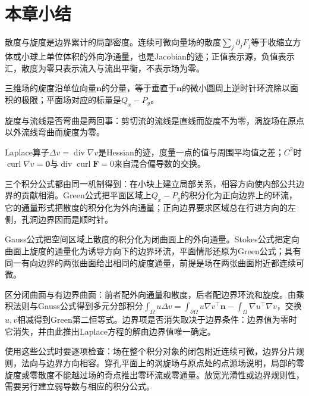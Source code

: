 \FloatBarrier
\section{本章小结}
\label{sec:integral-theorems-summary}

散度与旋度是边界累计的局部密度。连续可微向量场的散度$\sum_j\partial_jF_j$等于收缩立方体或小球上单位体积的外向净通量，也是Jacobian的迹；正值表示源，负值表示汇，散度为零只表示流入与流出平衡，不表示场为零。

三维场的旋度沿单位向量$\bm n$的分量，等于垂直于$\bm n$的微小圆周上逆时针环流除以面积的极限；平面场对应的标量是$Q_x-P_y$。

旋度与流线是否弯曲是两回事：剪切流的流线是直线而旋度不为零，涡旋场在原点以外流线弯曲而旋度为零。

Laplace算子$\Delta v=\operatorname{div}\nabla v$是Hessian的迹，度量一点的值与周围平均值之差；$C^2$时$\operatorname{curl}\nabla v=\bm0$与$\operatorname{div}\operatorname{curl}\bm F=0$来自混合偏导数的交换。

三个积分公式都由同一机制得到：在小块上建立局部关系，相容方向使内部公共边界的贡献相消。Green公式把平面区域上$Q_x-P_y$的积分化为正向边界上的环流，它的通量形式把散度的积分化为外向通量；正向边界要求区域总在行进方向的左侧，孔洞边界因而是顺时针。

Gauss公式把空间区域上散度的积分化为闭曲面上的外向通量。Stokes公式把定向曲面上旋度的通量化为诱导方向下的边界环流，平面情形还原为Green公式；具有同一有向边界的两张曲面给出相同的旋度通量，前提是场在两张曲面附近都连续可微。

区分闭曲面与有边界曲面：前者配外向通量和散度，后者配边界环流和旋度。由乘积法则与Gauss公式得到多元分部积分$\int_\Omega u\Delta v=\int_{\partial\Omega}u\nabla v^\top\bm n-\int_\Omega\nabla u^\top\nabla v$，交换$u,v$相减得到Green第二恒等式。边界项是否消失取决于边界条件：边界值为零时它消失，并由此推出Laplace方程的解由边界值唯一确定。

使用这些公式时要逐项检查：场在整个积分对象的闭包附近连续可微，边界分片规则，法向与边界方向相容。穿孔平面上的涡旋场与原点处的点源场说明，局部的零旋度或零散度不能越过场的奇点推出零环流或零通量。放宽光滑性或边界规则性，需要另行建立弱导数与相应的积分公式。
